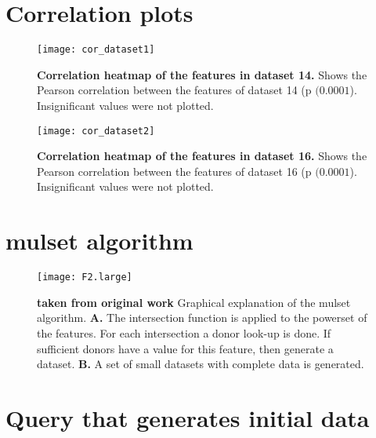 \newpage
\begin{appendices}

\section{Correlation plots}

\begin{figure}[htpb]
    \centering
    \texttt{[image: cor\_dataset1]}
    \caption{
        \textbf{Correlation heatmap of the features in dataset 14.}
        Shows the Pearson correlation between the features of dataset 14 (p \((0.0001\)).
        Insignificant values were not plotted.
    }\label{fig:cor-dataset1}
\end{figure}

\begin{figure}[htpb]
    \centering
    \texttt{[image: cor\_dataset2]}
    \caption{
        \textbf{Correlation heatmap of the features in dataset 16.}
        Shows the Pearson correlation between the features of dataset 16 (p \((0.0001\)).
        Insignificant values were not plotted.
    }
    \label{fig:cor-dataset2}
\end{figure}

\section{mulset algorithm}

\begin{figure}[htpb]
    \texttt{[image: F2.large]}
    \caption{
        \textbf{taken from original work}
        Graphical explanation of the mulset algorithm.
        \textbf{A.} The intersection function is applied to the powerset of the features. For each intersection a donor look-up is done. If sufficient donors have a value for this feature, then generate a dataset.
        \textbf{B.} A set of small datasets with complete data is generated.
    }\label{fig:mulsetAlg}
\end{figure}

\section{Query that generates initial \simon data}


\end{appendices}
